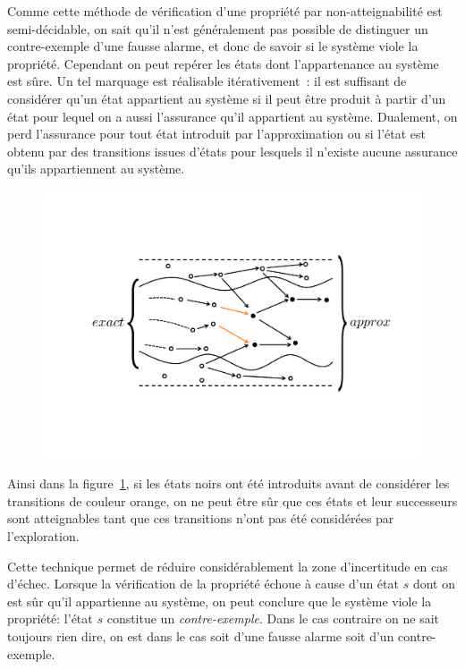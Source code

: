 Comme cette méthode de vérification d'une propriété par non-atteignabilité est semi-décidable,
on sait qu'il n'est généralement pas possible de distinguer un contre-exemple d'une fausse alarme,
et donc de savoir si le système viole la propriété.
Cependant on peut repérer les états dont l'appartenance au système est sûre. 
Un tel marquage est réalisable itérativement~: il est suffisant de considérer qu'un état
appartient au système si il peut être produit à partir d'un état pour lequel on a aussi l'assurance qu'il
appartient au système. Dualement, on perd l'assurance pour tout état introduit par l'approximation ou
si l'état est obtenu par des transitions issues d'états pour lesquels il n'existe aucune assurance
qu'ils appartiennent au système.
\begin{figure}[ht!]
  \centering
  \includegraphics[width=12cm]{4_contre_ex/illustration}
  \caption{\footnotesize }
  \label{fig:illustration}
\end{figure}
Ainsi dans la figure~\ref{fig:illustration}, si les états noirs ont été introduits avant de considérer les transitions
de couleur orange, on ne peut être sûr que ces états et leur successeurs sont atteignables tant que 
ces transitions n'ont pas été considérées par l'exploration.

Cette technique permet de réduire considérablement la zone d'incertitude en cas d'échec.
Lorsque la vérification de la propriété échoue à cause d'un état $s$ dont on est sûr
qu'il appartienne au système, on peut conclure que le système viole la propriété:
l'état $s$ constitue un \emph{contre-exemple}. Dans le cas contraire on ne sait toujours rien dire,
on est  dans le cas soit d'une fausse alarme soit d'un contre-exemple.

